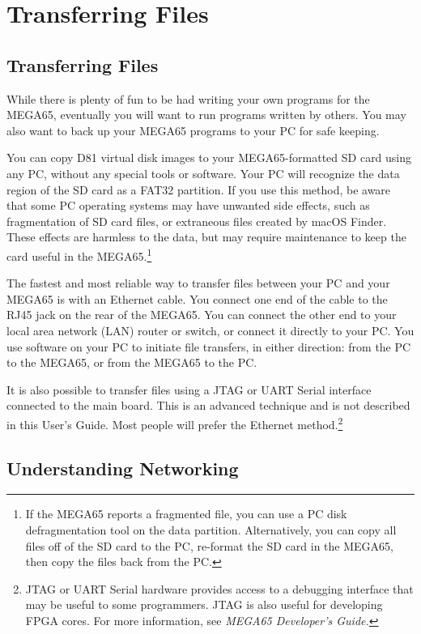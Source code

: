 \chapter{Transferring Files}

\section{Transferring Files}
\label{cha:transferring-files}

While there is plenty of fun to be had writing your own programs for the MEGA65, eventually you will want to run programs written by others. You may also want to back up your MEGA65 programs to your PC for safe keeping.

You can copy D81 virtual disk images to your MEGA65-formatted SD card using any PC, without any special tools or software. Your PC will recognize the data region of the SD card as a FAT32 partition. If you use this method, be aware that some PC operating systems may have unwanted side effects, such as fragmentation of SD card files, or extraneous files created by macOS Finder. These effects are harmless to the data, but may require maintenance to keep the card useful in the MEGA65.\footnote{If the MEGA65 reports a fragmented file, you can use a PC disk defragmentation tool on the data partition. Alternatively, you can copy all files off of the SD card to the PC, re-format the SD card in the MEGA65, then copy the files back from the PC.}

The fastest and most reliable way to transfer files between your PC and your MEGA65 is with an Ethernet cable. You connect one end of the cable to the RJ45 jack on the rear of the MEGA65. You can connect the other end to your local area network (LAN) router or switch, or connect it directly to your PC. You use software on your PC to initiate file transfers, in either direction: from the PC to the MEGA65, or from the MEGA65 to the PC.

It is also possible to transfer files using a JTAG or UART Serial interface connected to the main board. This is an advanced technique and is not described in this User's Guide. Most people will prefer the Ethernet method.\footnote{JTAG or UART Serial hardware provides access to a debugging interface that may be useful to some programmers. JTAG is also useful for developing FPGA cores. For more information, see {\it MEGA65 Developer's Guide.}}

\section{Understanding Networking}

